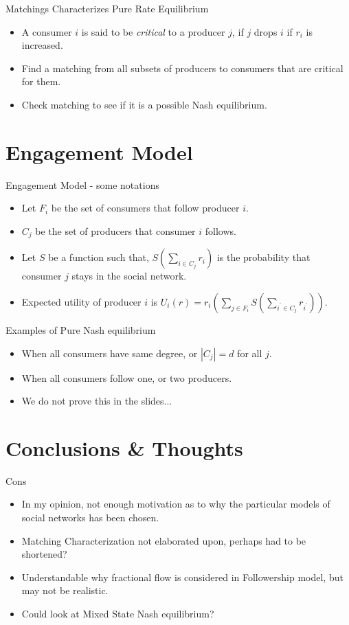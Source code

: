 \documentclass[aspectratio=169]{beamer}
\newcommand{\bi}{\begin{itemize}}
\newcommand{\ei}{\end{itemize}}
\begin{document}
\begin{frame}{Matchings Characterizes Pure Rate Equilibrium}
    \bi
\item A consumer $i$ is said to be \textit{critical} to a producer $j$, if $j$
    drops $i$ if $r_i$ is increased.
    \pause
\item Find a matching from all subsets of producers to consumers that are
    critical for them.
    \pause
\item Check matching to see if it is a possible Nash equilibrium.
    \ei
\end{frame}

\section{Engagement Model}
\begin{frame}{Engagement Model - some notations}
    \bi
\item Let $F_i$ be the set of consumers that follow producer $i$.
    \pause
\item $C_j$ be the set of producers that consumer $i$ follows.
    \pause
\item Let $S$ be a function such that, $S(\sum_{i \in C_j}r_i)$ is the
    probability that consumer $j$ stays in the social network.
    \pause
\item Expected utility of producer $i$ is $U_{i}(r) = r_i(\sum_{j \in
        F_i}S(\sum_{i^{\prime}\in C_j}r_{i^{\prime}}))$.
    \ei
\end{frame}

\begin{frame}{Examples of Pure Nash equilibrium}
    \bi
\item When all consumers have same degree, or $|C_j| = d$ for all $j$.
    \pause
\item When all consumers follow one, or two producers.
    \pause
\item We do not prove this in the slides...
    \ei
\end{frame}

\section{Conclusions \& Thoughts}
\begin{frame}{Cons}
    \bi
\item In my opinion, not enough motivation as to why the particular models of social networks
    has been chosen.
\item Matching Characterization not elaborated upon, perhaps had to be
    shortened?
\item Understandable why fractional flow is considered in Followership model,
    but may not be realistic.
\item Could look at Mixed State Nash equilibrium?
    \ei
\end{frame}
\end{document}
